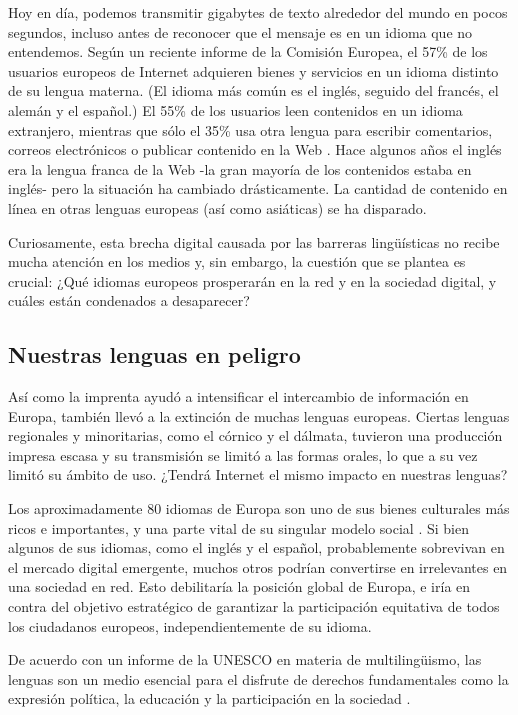 \begin{multicols}{2}
  Hoy en día, podemos transmitir gigabytes de texto alrededor del mundo en pocos segundos, incluso antes de reconocer que el mensaje es en un idioma que no entendemos. Según un reciente informe de la Comisión Europea, el 57\% de los usuarios europeos de Internet adquieren bienes y servicios en un idioma distinto de su lengua materna. (El idioma más común es el inglés, seguido del francés, el alemán y el español.) El 55\% de los usuarios leen contenidos en un idioma extranjero, mientras que sólo el 35\% usa otra lengua para escribir comentarios, correos electrónicos o publicar contenido en la Web \cite{EC1}.  Hace algunos años el inglés era la lengua franca de la Web -la gran mayoría de los contenidos estaba en inglés- pero la situación ha cambiado drásticamente. La cantidad de contenido en línea en otras lenguas europeas (así como asiáticas) se ha disparado.

  Curiosamente, esta brecha digital causada por las barreras lingüísticas no recibe mucha atención en los medios y, sin embargo, la cuestión que se plantea es crucial: ¿Qué idiomas europeos prosperarán en la red y en la sociedad digital, y cuáles están condenados a desaparecer?

\subsection{Nuestras lenguas en peligro}

  Así como la imprenta ayudó a intensificar el intercambio de información en Europa, también llevó a la extinción de muchas lenguas europeas. Ciertas lenguas regionales y minoritarias, como el córnico y el dálmata, tuvieron una producción impresa escasa y su transmisión se limitó a las formas orales, lo que a su vez limitó su ámbito de uso. ¿Tendrá  Internet el mismo impacto en nuestras lenguas?

  Los aproximadamente 80 idiomas de Europa son uno de sus bienes culturales más ricos e importantes, y una parte vital de su singular modelo social \cite{EC2}.
  Si bien algunos de sus idiomas, como el inglés y el español, probablemente sobrevivan en el mercado digital emergente, muchos otros podrían convertirse en irrelevantes en una sociedad en red. Esto debilitaría la posición global de Europa, e iría en contra del objetivo estratégico de garantizar la participación equitativa de todos los ciudadanos europeos, independientemente de su idioma. 
  
  De acuerdo con un informe de la UNESCO en materia de multilingüismo, las lenguas son un medio esencial para el disfrute de derechos fundamentales como la expresión política, la educación y la participación en la sociedad \cite{Unesco1}.  


\end{multicols}
